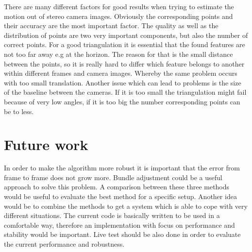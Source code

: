 \documentclass[11pt]{article}
\begin{document}
	There are many different factors for good results when trying to estimate the motion out of stereo camera images. Obviously the corresponding points and their accuracy are the most important factor. The quality as well as the distribution of points are two very important components, but also the number of correct points. For a good triangulation it is essential that the found features are not too far away e.g at the horizon. The reason for that is the small distance between the points, so it is really hard to differ which feature belongs to another within different frames and camera images. Whereby the same problem occurs with too small translation. Another issue which can lead to problems is the size of the baseline between the cameras. If it is too small the triangulation might fail because of very low angles, if it is too big the number corresponding points can be to less.
	
	
	\section{Future work}
	In order to make the algorithm more robust it is important that the error from frame to frame does not grow more. Bundle adjustment could be a useful approach to solve this problem. A comparison between these three methods would be useful to evaluate the best method for a specific setup. Another idea would be to combine the methods to get a system which is able to cope with very different situations. The current code is basically written to be used in a comfortable way, therefore an implementation with focus on performance and stability would be important. Live test should be also done in order to evaluate the current performance and robustness.

	\newpage
	
\end{document}

